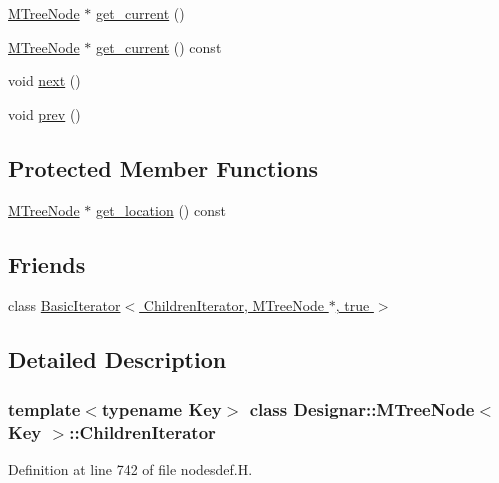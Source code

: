 \begin{DoxyCompactItemize}
\hyperlink{class_designar_1_1_m_tree_node}{M\+Tree\+Node} $\ast$ \hyperlink{class_designar_1_1_m_tree_node_1_1_children_iterator_a3ff90febfde4709c61d50107ce9761d5}{get\+\_\+current} ()
\item 
\hyperlink{class_designar_1_1_m_tree_node}{M\+Tree\+Node} $\ast$ \hyperlink{class_designar_1_1_m_tree_node_1_1_children_iterator_a70ef87f4fdd20504fdb9927f49dc847d}{get\+\_\+current} () const
\item 
void \hyperlink{class_designar_1_1_m_tree_node_1_1_children_iterator_a49c1adf58fd0fa57cf45fa3ae4f57f26}{next} ()
\item 
void \hyperlink{class_designar_1_1_m_tree_node_1_1_children_iterator_addf6dc80ece81a04056796a6ec35354a}{prev} ()
\end{DoxyCompactItemize}
\subsection*{Protected Member Functions}
\begin{DoxyCompactItemize}
\item 
\hyperlink{class_designar_1_1_m_tree_node}{M\+Tree\+Node} $\ast$ \hyperlink{class_designar_1_1_m_tree_node_1_1_children_iterator_a59d7d79081ab145a9ab886ee4873ae57}{get\+\_\+location} () const
\end{DoxyCompactItemize}
\subsection*{Friends}
\begin{DoxyCompactItemize}
\item 
class \hyperlink{class_designar_1_1_m_tree_node_1_1_children_iterator_a9318ecb15aa59102557883ca0b98fea5}{Basic\+Iterator$<$ Children\+Iterator, M\+Tree\+Node $\ast$, true $>$}
\end{DoxyCompactItemize}


\subsection{Detailed Description}
\subsubsection*{template$<$typename Key$>$\newline
class Designar\+::\+M\+Tree\+Node$<$ Key $>$\+::\+Children\+Iterator}



Definition at line 742 of file nodesdef.\+H.



